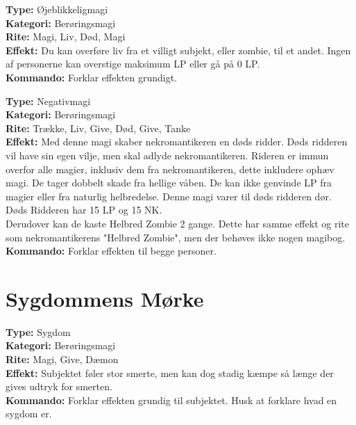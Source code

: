 \begin{zombie*}
\textbf{Type:} Øjeblikkeligmagi\\
\textbf{Kategori:} Berøringsmagi\\
\textbf{Rite:} Magi, Liv, Død, Magi\\
\textbf{Effekt:} Du kan overføre liv fra et villigt subjekt, eller zombie, til et andet. Ingen af personerne kan overstige maksimum LP eller gå på 0 LP.\\
\textbf{Kommando:} Forklar effekten grundigt.
\end{zombie*}

\begin{zombie*}
\textbf{Type:} Negativmagi\\
\textbf{Kategori:} Berøringsmagi\\
\textbf{Rite:} Trække, Liv, Give, Død, Give, Tanke\\
\textbf{Effekt:} Med denne magi skaber nekromantikeren en døds ridder. Døds ridderen vil have sin egen vilje, men skal adlyde nekromantikeren. Rideren er immun overfor alle magier, inklusiv dem fra nekromantikeren, dette inkludere ophæv magi. De tager dobbelt skade fra hellige våben. De kan ikke genvinde LP fra magier eller fra naturlig helbredelse. Denne magi varer til døds ridderen dør. Døds Ridderen har 15 LP og 15 NK.\\
Derudover kan de kaste Helbred Zombie 2 gange. Dette har samme effekt og rite som nekromantikerens "Helbred Zombie", men der behøves ikke nogen magibog.
\textbf{Kommando:} Forklar effekten til begge personer.\\

\end{zombie*}

\section*{Sygdommens Mørke}

\begin{sygdom*}[Forrådnelse]
\textbf{Type:} Sygdom\\
\textbf{Kategori:} Berøringsmagi\\
\textbf{Rite:} Magi, Give, Dæmon\\
\textbf{Effekt:} Subjektet føler stor smerte, men kan dog stadig kæmpe så længe der gives udtryk for smerten.\\
\textbf{Kommando:} Forklar effekten grundig til subjektet. Husk at forklare hvad en sygdom er.
\end{sygdom*}

